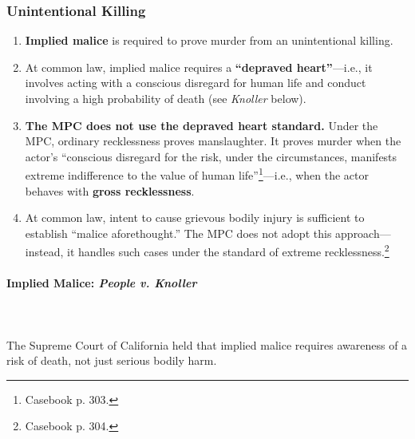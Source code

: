\subsubsection{Unintentional Killing}

\begin{enumerate}
    \item \textbf{Implied malice} is required to prove murder from an 
    unintentional killing.
    \item At common law, implied malice requires a \textbf{``depraved 
    heart''}---i.e., it involves acting with a conscious disregard for human 
    life and conduct involving a high probability of death (see \emph{Knoller} 
    below).
    \item \textbf{The MPC does not use the depraved heart standard.} Under the 
    MPC, ordinary recklessness proves manslaughter. It proves murder when the 
    actor's ``conscious disregard for the risk, under the circumstances, 
    manifests extreme indifference to the value of human 
    life''\footnote{Casebook p. 303.}---i.e., when the actor behaves with 
    \textbf{gross recklessness}.
    \item At common law, intent to cause grievous bodily injury is sufficient 
    to establish ``malice aforethought.'' The MPC does not adopt this 
    approach---instead, it handles such cases under the standard of extreme 
    recklessness.\footnote{Casebook p. 304.}
\end{enumerate}

\paragraph{Implied Malice: \emph{People v. Knoller}}
~\\\\
The Supreme Court of California held that implied malice requires awareness of 
a risk of death, not just serious bodily harm.

